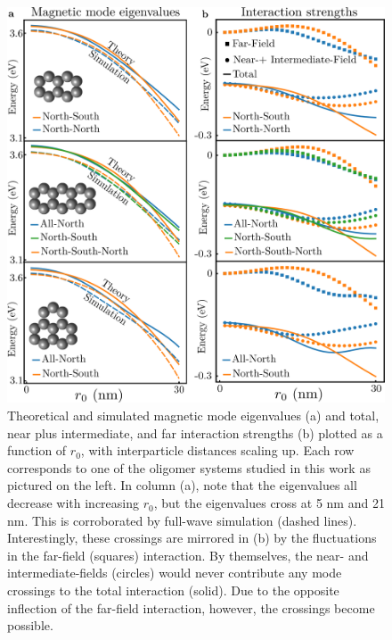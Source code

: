 \documentclass[12pt, letterpaper, twoside]{report}
\begin{document}
\begin{figure}
\centering
\includegraphics[width=6in]{scale_eigs.png}
\caption{Theoretical and simulated magnetic mode eigenvalues (a) and total, near plus intermediate, and far interaction strengths (b) plotted as a function of $r_0$, with interparticle distances scaling up. Each row corresponds to one of the oligomer systems studied in this work as pictured on the left. In column (a), note that the eigenvalues all decrease with increasing $r_0$, but the eigenvalues cross at 5 nm and 21 nm. This is corroborated by full-wave simulation (dashed lines). Interestingly, these crossings are mirrored in (b) by the fluctuations in the far-field (squares) interaction. By themselves, the near- and intermediate-fields (circles) would never contribute any mode crossings to the total interaction (solid). Due to the opposite inflection of the far-field interaction, however, the crossings become possible.}
\label{scaling}
\end{figure}
\end{document}

